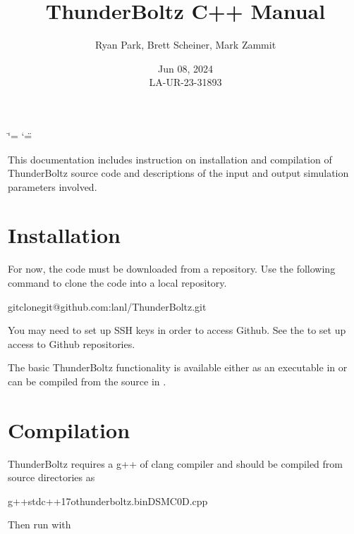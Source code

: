 \documentclass[letterpaper,10pt,english,openany,oneside]{sphinxmanual}
\title{ThunderBoltz C++ Manual}
\date{Jun 08, 2024\\LA-UR-23-31893}
\author{Ryan Park, Brett Scheiner, Mark Zammit}
\affil{Los Alamos National Laboratory, Los Alamos, NM, 87545}
\begin{document}
\ifdefined\shorthandoff
  \ifnum\catcode`\=\string=\active\shorthandoff{=}\fi
  \ifnum\catcode`\"=\active{}\fi
\fi

\pagestyle{empty}
\sphinxmaketitle
\pagestyle{plain}
\sphinxtableofcontents
\pagestyle{normal}
\label{\detokenize{short_index::doc}}


\sphinxAtStartPar
This documentation includes instruction on installation
and compilation of ThunderBoltz source code and descriptions
of the input and output simulation parameters involved.


\chapter{Installation}
\label{\detokenize{short_index:installation}}
\sphinxAtStartPar
For now, the code must be downloaded from a repository.
Use the following command to clone the code into a local repository.

\begin{sphinxVerbatim}[commandchars=\\\{\}]
gitclonegit@github.com:lanl/ThunderBoltz.git
\end{sphinxVerbatim}

\sphinxAtStartPar
You may need to set up SSH keys in order to access Github. See the
to set up access to Github repositories.

\sphinxAtStartPar
The basic ThunderBoltz functionality is available either
as an executable in  or can be compiled from the
source in .

\chapter{Compilation}
\label{\detokenize{short_index:compilation}}
\sphinxAtStartPar
ThunderBoltz requires a g++ of clang compiler and should be compiled
from source directories as

\begin{sphinxVerbatim}[commandchars=\\\{\}]
g++\PYGZhy{}stdc++17\PYGZhy{}othunderboltz.binDSMC0D.cpp
\end{sphinxVerbatim}

\sphinxAtStartPar
Then run with
\end{document}
